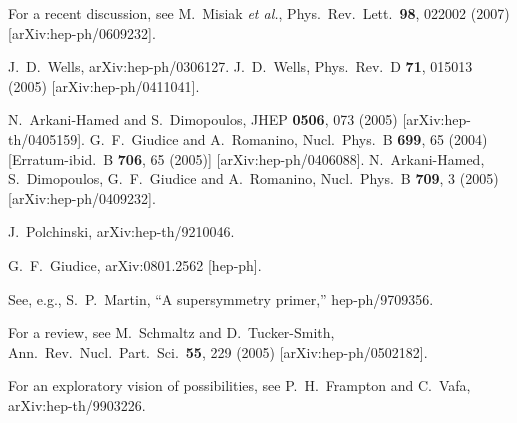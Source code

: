 \documentclass[12pt]{article}
\begin{document}
\begin{thebibliography}{9}
For a recent discussion, see
  M.~Misiak {\it et al.},
  Phys.\ Rev.\ Lett.\  {\bf 98}, 022002 (2007)
  [arXiv:hep-ph/0609232].

  J.~D.~Wells,
  arXiv:hep-ph/0306127.
  J.~D.~Wells,
  Phys.\ Rev.\  D {\bf 71}, 015013 (2005)
  [arXiv:hep-ph/0411041].

  N.~Arkani-Hamed and S.~Dimopoulos,
  JHEP {\bf 0506}, 073 (2005)
  [arXiv:hep-th/0405159].
  G.~F.~Giudice and A.~Romanino,
  Nucl.\ Phys.\  B {\bf 699}, 65 (2004)
  [Erratum-ibid.\  B {\bf 706}, 65 (2005)]
  [arXiv:hep-ph/0406088].
  N.~Arkani-Hamed, S.~Dimopoulos, G.~F.~Giudice and A.~Romanino,
  Nucl.\ Phys.\  B {\bf 709}, 3 (2005)
  [arXiv:hep-ph/0409232].


  J.~Polchinski,
  arXiv:hep-th/9210046.

  G.~F.~Giudice,
  arXiv:0801.2562 [hep-ph].

See, e.g., S.~P.~Martin, ``A supersymmetry primer,''
  hep-ph/9709356.

For a review, see
  M.~Schmaltz and D.~Tucker-Smith,
  Ann.\ Rev.\ Nucl.\ Part.\ Sci.\  {\bf 55}, 229 (2005)
  [arXiv:hep-ph/0502182].

For an exploratory vision of possibilities, see
  P.~H.~Frampton and C.~Vafa,
  arXiv:hep-th/9903226.



\end{thebibliography}
\end{document}
